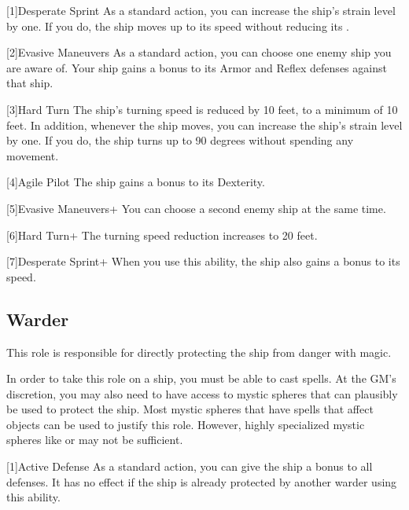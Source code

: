     [1]{Desperate Sprint} As a standard action, you can increase the ship's strain level by one.
      If you do, the ship moves up to its speed without reducing its .

    [2]{Evasive Maneuvers} As a standard action, you can choose one enemy ship you are aware of.
      Your ship \briefly gains a  bonus to its Armor and Reflex defenses against that ship.

    [3]{Hard Turn} The ship's turning speed is reduced by 10 feet, to a minimum of 10 feet.
      In addition, whenever the ship moves, you can increase the ship's strain level by one.
      If you do, the ship turns up to 90 degrees without spending any movement.

    [4]{Agile Pilot} The ship gains a  bonus to its Dexterity.

    [5]{Evasive Maneuvers+} You can choose a second enemy ship at the same time.

    [6]{Hard Turn+} The turning speed reduction increases to 20 feet.

    [7]{Desperate Sprint+} When you use this ability, the ship also \briefly gains a  bonus to its speed.

  \subsection{Warder}
    This role is responsible for directly protecting the ship from danger with magic.

    In order to take this role on a ship, you must be able to cast spells.
    At the GM's discretion, you may also need to have access to mystic spheres that can plausibly be used to protect the ship.
    Most mystic spheres that have spells that affect objects can be used to justify this role.
    However, highly specialized mystic spheres like  or  may not be sufficient.

    [1]{Active Defense} As a standard action, you can \briefly give the ship a  bonus to all defenses.
      It has no effect if the ship is already protected by another warder using this ability.

